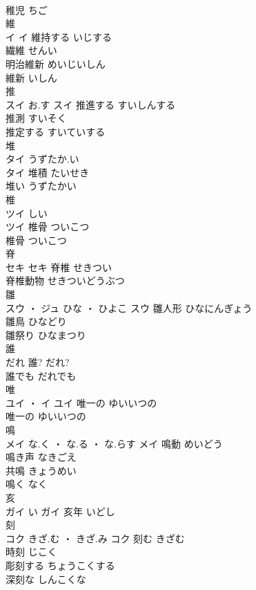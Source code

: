 \documentclass[8pt]{extreport}
\begin{document}
\begin{CJK}{UTF8}{min}
\\	稚児	ちご	
\\	維	
\\	イ		イ	維持する	いじする	
\\	繊維	せんい	
\\	明治維新	めいじいしん	
\\	維新	いしん	
\\	推	
\\	スイ	お.す	スイ	推進する	すいしんする	
\\	推測	すいそく	
\\	推定する	すいていする	
\\	堆	
\\	タイ	うずたか.い
\\	タイ	堆積	たいせき	
\\	堆い	うずたかい	
\\	椎	
\\	ツイ	しい
\\	ツイ	椎骨	ついこつ	
\\	椎骨	ついこつ	
\\	脊	
\\	セキ		セキ	脊椎	せきつい	
\\	脊椎動物	せきついどうぶつ	
\\	雛	
\\	スウ ・ ジュ	ひな ・ ひよこ	スウ	雛人形	ひなにんぎょう	
\\	雛鳥	ひなどり	
\\	雛祭り	ひなまつり	
\\	誰	
\\	だれ														誰?	だれ?	
\\	誰でも	だれでも	
\\	唯	
\\	ユイ ・ イ		ユイ	唯一の	ゆいいつの	
\\	唯一の	ゆいいつの	
\\	鳴	
\\	メイ	な.く ・ な.る ・ な.らす	メイ	鳴動	めいどう	
\\	鳴き声	なきごえ	
\\	共鳴	きょうめい	
\\	鳴く	なく	
\\	亥	
\\	ガイ	い	ガイ	亥年	いどし	
\\	刻	
\\	コク	きざ.む ・ きざ.み	コク	刻む	きざむ	
\\	時刻	じこく	
\\	彫刻する	ちょうこくする	
\\	深刻な	しんこくな	

\end{CJK}
\end{document}
